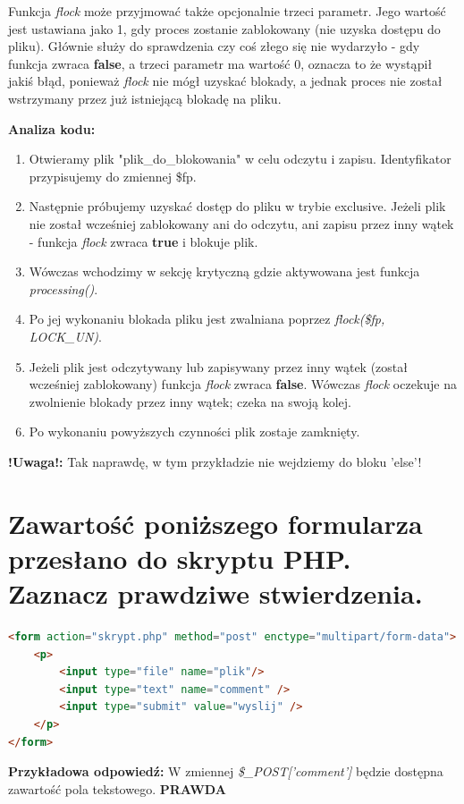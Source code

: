 \begin{enumerate}
Funkcja \textit{flock} może przyjmować także opcjonalnie trzeci parametr. Jego wartość jest ustawiana jako 1, gdy proces zostanie zablokowany (nie uzyska dostępu do pliku). Głównie służy do sprawdzenia czy coś złego się nie wydarzyło - gdy funkcja zwraca \textbf{false}, a trzeci parametr ma wartość 0, oznacza to że wystąpił jakiś błąd, ponieważ \textit{flock} nie mógł uzyskać blokady, a jednak proces nie został wstrzymany przez już istniejącą blokadę na pliku.
\end{enumerate}


\textbf{Analiza kodu:}
\begin{enumerate}
\item
Otwieramy plik "plik\_do\_blokowania" w celu odczytu i zapisu. Identyfikator przypisujemy do zmiennej \$fp.
\item
Następnie próbujemy uzyskać dostęp do pliku w trybie exclusive.
Jeżeli plik nie został wcześniej zablokowany ani do odczytu, ani zapisu przez inny wątek - funkcja \textit{flock} zwraca \textbf{true} i blokuje plik.
\item
Wówczas wchodzimy w sekcję krytyczną gdzie aktywowana jest funkcja \textit{processing()}.
\item
Po jej wykonaniu blokada pliku jest zwalniana poprzez \textit{flock(\$fp, LOCK\_UN)}.
\item
Jeżeli plik jest odczytywany lub zapisywany przez inny wątek (został wcześniej zablokowany) funkcja \textit{flock} zwraca \textbf{false}.
Wówczas \textit{flock} oczekuje na zwolnienie blokady przez inny wątek; czeka na swoją kolej.
\item
Po wykonaniu powyższych czynności plik zostaje zamknięty.
\end{enumerate}

\textbf{!Uwaga!: }Tak naprawdę, w tym przykładzie nie wejdziemy do bloku 'else'!

\section{Zawartość poniższego formularza przesłano do skryptu PHP. Zaznacz prawdziwe stwierdzenia.}
\begin{lstlisting}[language=html]
<form action="skrypt.php" method="post" enctype="multipart/form-data">
	<p>
		<input type="file" name="plik"/>
		<input type="text" name="comment" />
		<input type="submit" value="wyslij" />
	</p>
</form>
\end{lstlisting}

\noindent
{\textbf{Przykładowa odpowiedź:}}
W zmiennej \textit{\$\_POST['comment']} będzie dostępna zawartość pola tekstowego.
\textbf{PRAWDA}

